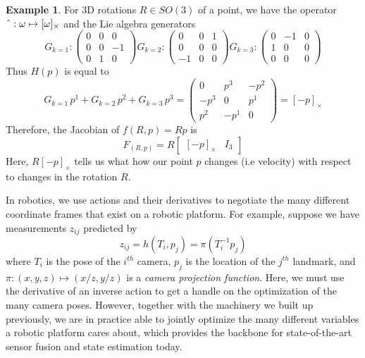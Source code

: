 \documentclass[reqno]{amsart}
\theoremstyle{definition}
\newtheorem{exmp}{Example}[section]
\numberwithin{equation}{section}
\begin{document}
\begin{exmp}
    For 3D rotations $R \in SO(3)$ of a point, we have the operator $\string^ : \omega \mapsto [\omega]_{\times}$ and the Lie algebra generators
    \begin{equation*}
        G_{k=1}:\begin{pmatrix}
            0 & 0 & 0 \\
            0 & 0 & -1 \\
            0 & 1 & 0
        \end{pmatrix}
        G_{k=2}:\begin{pmatrix}
            0 & 0 & 1 \\
            0 & 0 & 0 \\
            -1 & 0 & 0
        \end{pmatrix}
        G_{k=3}:\begin{pmatrix}
            0 & -1 & 0 \\
            1 & 0 & 0 \\
            0 & 0 & 0
        \end{pmatrix}
    \end{equation*}
    Thus $H(p)$ is equal to
    \begin{equation*}
        G_{k=1}\,p^1 + G_{k=2}\,p^2 + G_{k=3}\,p^3
        = \begin{pmatrix}
            0 & p^3 & -p^2 \\
            -p^3 & 0 & p^1 \\
            p^2 & -p^1 & 0
        \end{pmatrix} = [-p]_{\times}
    \end{equation*}
    Therefore, the Jacobian of $f(R, p) = Rp$ is
    \begin{equation*}
        F_{(R, p)} = R\begin{bmatrix}
            [-p]_{\times} & I_3
        \end{bmatrix}
    \end{equation*}
    Here, $R[-p]_{\times}$ tells us what how our point $p$ changes (i.e velocity) with respect to changes in the rotation $R$.
\end{exmp}

In robotics, we use actions and their derivatives to negotiate the many different coordinate frames that exist on a robotic platform. For example, suppose we have measurements $z_{ij}$ predicted by
\begin{equation*}
    z_{ij} = h(T_i, p_j) = \pi(T_i^{-1}p_j)
\end{equation*}
where $T_i$ is the pose of the $i^{th}$ camera, $p_j$ is the location of the $j^{th}$ landmark, and $\pi : (x, y, z) \mapsto (x/z, y/z)$ is a \textit{camera projection function}. Here, we must use the derivative of an inverse action to get a handle on the optimization of the many camera poses. However, together with the machinery we built up previously, we are in practice able to jointly optimize the many different variables a robotic platform cares about, which provides the backbone for state-of-the-art sensor fusion and state estimation today.
\end{document}
